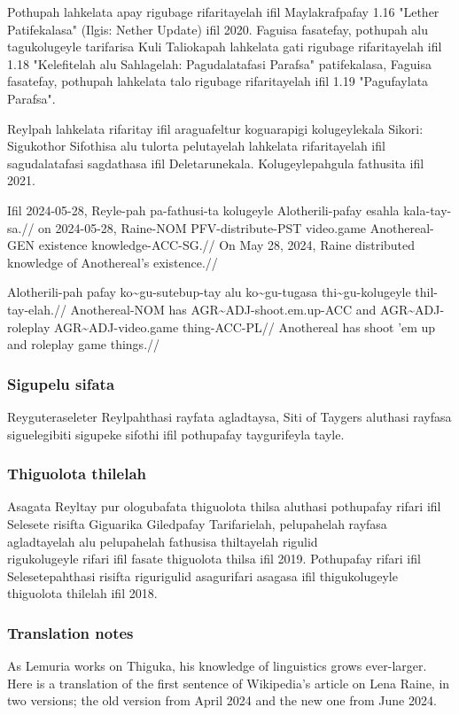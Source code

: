 Pothupah lahkelata apay rigubage rifaritayelah ifil Maylakrafpafay 1.16 "Lether Patifekalasa" (Ilgis: Nether Update) ifil 2020.
Faguisa fasatefay, pothupah alu tagukolugeyle tarifarisa Kuli Taliokapah lahkelata gati rigubage rifaritayelah ifil 1.18 "Kelefitelah alu Sahlagelah: Pagudalatafasi Parafsa" patifekalasa, Faguisa fasatefay, pothupah lahkelata talo rigubage rifaritayelah ifil 1.19 "Pagufaylata Parafsa".

Reylpah lahkelata rifaritay ifil araguafeltur koguarapigi kolugeylekala Sikori: Sigukothor Sifothisa alu tulorta pelutayelah lahkelata rifaritayelah ifil sagudalatafasi sagdathasa ifil Deletarunekala.
Kolugeylepahgula fathusita ifil 2021.

\ex
\begingl
\gla Ifil 2024-05-28, Reyle-pah pa-fathusi-ta      kolugeyle  Alotherili-pafay esahla    kala-tay-sa.//
\glb  on   2024-05-28, Raine-NOM PFV-distribute-PST video.game Anothereal-GEN   existence knowledge-ACC-SG.//
\glft On May 28, 2024, Raine distributed knowledge of Anothereal's existence.//
\endgl
\xe

\ex
\begingl
\gla Alotherili-pah pafay ko\~{}gu-sutebup-tay       alu ko\~{}gu-tugasa     thi\~{}gu-kolugeyle   thil-tay-elah.//
\glb Anothereal-NOM has   AGR\~{}ADJ-shoot.em.up-ACC and AGR\~{}ADJ-roleplay AGR\~{}ADJ-video.game thing-ACC-PL//
\glft Anothereal has shoot 'em up and roleplay game things.//
\endgl
\xe


\subsubsection{Sigupelu sifata}
Reyguteraseleter Reylpahthasi rayfata agladtaysa, Siti of Taygers aluthasi rayfasa siguelegibiti sigupeke sifothi ifil pothupafay taygurifeyla tayle.

\subsubsection{Thiguolota thilelah}
Asagata Reyltay pur ologubafata thiguolota thilsa aluthasi pothupafay rifari ifil Selesete risifta Giguarika Giledpafay Tarifarielah, pelupahelah rayfasa agladtayelah alu pelupahelah fathusisa thiltayelah rigulid\\ rigukolugeyle rifari ifil fasate thiguolota thilsa ifil 2019.
Pothupafay rifari ifil Selesetepahthasi risifta rigurigulid asagurifari asagasa ifil thigukolugeyle thiguolota thilelah ifil 2018.

\subsubsection{Translation notes}
As Lemuria works on Thiguka, his knowledge of linguistics grows ever-larger.
Here is a translation of the first sentence of Wikipedia's article on Lena Raine, in two versions; the old version from April 2024 and the new one from June 2024.

